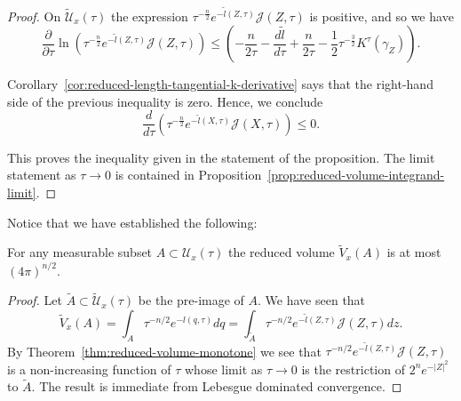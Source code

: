 \begin{proof}
On $\widetilde {\mathcal U}_x(\tau)$ the expression
$\tau^{-\frac{n}{2}}e^{-\widetilde l(Z,\tau)}{\mathcal J}(Z,\tau)$
is positive, and so we have
$$\frac{\partial}{\partial\tau}\ln\left(\tau^{-\frac{n}{2}}e^{-\widetilde
l(Z,\tau)}{\mathcal J}(Z,\tau)\right)\le
\left(-\frac{n}{2\tau}-\frac{d\widetilde l}{d
\tau}+\frac{n}{2\tau}-\frac{1}{2}\tau^{-\frac{3}{2}}K^\tau(\gamma_Z)\right).$$


Corollary~\ref{cor:reduced-length-tangential-k-derivative} says that the right-hand side of the
previous inequality is zero. Hence, we conclude
\begin{equation}\label{Jineq}
\frac{d}{d\tau}\left(\tau^{-\frac{n}{2}}e^{-\tilde
l(X,\tau)}{\mathcal J}(X,\tau)\right)\le 0. \end{equation}

This proves the inequality given in the statement of the
proposition. The limit statement as $\tau\rightarrow 0$ is contained
in Proposition~\ref{prop:reduced-volume-integrand-limit}.
\end{proof}

Notice that we have established the following:


\begin{corollary}\label{cor:reduced-volume-bounded}
\label{finiteredvol}

For any measurable subset $A\subset {\mathcal U}_x(\tau)$ the
reduced volume  $\widetilde V_x(A)$ is at most $(4\pi)^{n/2}$.
\end{corollary}


\begin{proof}
\sketch
Let $\widetilde A\subset \widetilde {\mathcal U}_x(\tau)$ be the pre-image
of $A$. We have seen that
$$\widetilde V_x(A)=\int_{A}\tau^{-n/2}e^{-l(q,\tau)}dq=\int_{\widetilde
A}\tau^{-n/2}e^{-\tilde l(Z,\tau)}{\mathcal J}(Z,\tau)dz.$$ By
Theorem~\ref{thm:reduced-volume-monotone} we see that $\tau^{-n/2}e^{-\tilde
l(Z,\tau)}{\mathcal J}(Z,\tau)$ is a non-increasing function of
$\tau$ whose limit as $\tau\rightarrow 0$ is the restriction of
$2^ne^{-|Z|^2}$ to $\widetilde A$. The result is immediate from
Lebesgue dominated convergence.
\end{proof}
